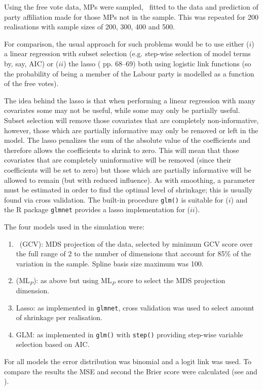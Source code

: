 Using the free vote data, MPs were sampled, \mdsds\ fitted to the data and prediction of party affiliation made for those MPs not in the sample. This was repeated for 200 realisations with sample sizes of 200, 300, 400 and 500.

For comparison, the usual approach for such problems would be to use either ($i$) a linear regression with subset selection (e.g. step-wise selection of model terms by, say, AIC) or ($ii$) the lasso (\cite{elements} pp. 68--69) both using logistic link functions (so the probability of being a member of the Labour party is modelled as a function of the free votes). 

The idea behind the lasso is that when performing a linear regression with many covariates some may not be useful, while some may only be partially useful. Subset selection will remove those covariates that are completely non-informative, however, those which are partially informative may only be removed or left in the model. The lasso penalizes the sum of the absolute value of the coefficients and therefore allows the coefficients to shrink to zero. This will mean that those covariates that are completely uninformative will be removed (since their coefficients will be set to zero) but those which are partially informative will be allowed to remain (but with reduced influence). As with smoothing, a parameter must be estimated in order to find the optimal level of shrinkage; this is usually found via cross validation. The built-in procedure \texttt{glm()} is suitable for ($i$) and the \textsf{R} package \texttt{glmnet} provides a lasso implementation for ($ii$).

The four models used in the simulation were:
\begin{enumerate}
	\item \mdsds\ (GCV): MDS projection of the data, selected by minimum GCV score over the full range of 2 to the number of dimensions that account for 85\% of the variation in the sample. Spline basis size maximum was 100.
	\item \mdsds\: ($\text{ML}_P$): as above but using $\text{ML}_P$ score to select the MDS projection dimension.
	\item Lasso: as implemented in \texttt{glmnet}, cross validation was used to select amount of shrinkage per realisation.
	\item GLM: as implemented in \texttt{glm()} with \texttt{step()} providing step-wise variable selection based on AIC.
\end{enumerate}
For all models the error distribution was binomial and a logit link was used. To compare the results the MSE and second the Brier score were calculated (see  and ).


